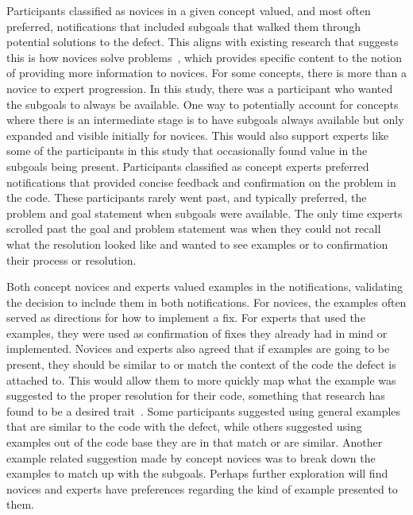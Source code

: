 Participants classified as novices in a given concept valued, and most often preferred, notifications that included subgoals that walked them through potential solutions to the defect. This aligns with existing research that suggests this is how novices solve problems~\cite{larkin1980expert}, which provides specific content to the notion of providing more information to novices. 
For some concepts, there is more than a novice to expert progression.
In this study, there was a participant who wanted the subgoals to always be available.
One way to potentially account for concepts where there is an intermediate stage is to have subgoals always available but only expanded and visible initially for novices.
This would also support experts like some of the participants in this study that occasionally found value in the subgoals being present.
Participants classified as concept experts preferred notifications that provided concise feedback and confirmation on the problem in the code. 
These participants rarely went past, and typically preferred, the problem and goal statement when subgoals were available. The only time experts scrolled past the goal and problem statement was when they could not recall what the resolution looked like and wanted to see examples or to confirmation their process or resolution.

Both concept novices and experts valued examples in the notifications, validating the decision to include them in both notifications. 
For novices, the examples often served as directions for how to implement a fix.
For experts that used the examples, they were used as confirmation of fixes they already had in mind or implemented.
Novices and experts also agreed that if examples are going to be present, they should be similar to or match the context of the code the defect is attached to.
This would allow them to more quickly map what the example was suggested to the proper resolution for their code, something that research has found to be a desired trait~\cite{nasehi2012makes}.
Some participants suggested using general examples that are similar to the code with the defect, while others suggested using examples out of the code base they are in that match or are similar. 
Another example related suggestion made by concept novices was to break down the examples to match up with the subgoals.
Perhaps further exploration will find novices and experts have preferences regarding the kind of example presented to them.

